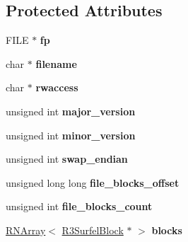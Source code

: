\subsection*{Protected Attributes}
\begin{DoxyCompactItemize}
\item 
F\+I\+LE $\ast$ {\bfseries fp}\hypertarget{class_r3_surfel_database_a3989dcfef3c4b81f7cb51388e44b7cf7}{}\label{class_r3_surfel_database_a3989dcfef3c4b81f7cb51388e44b7cf7}

\item 
char $\ast$ {\bfseries filename}\hypertarget{class_r3_surfel_database_adcab62eb583e8b42d8712c679f6bd3b0}{}\label{class_r3_surfel_database_adcab62eb583e8b42d8712c679f6bd3b0}

\item 
char $\ast$ {\bfseries rwaccess}\hypertarget{class_r3_surfel_database_a75c7d17ac62b8f7352e34e7138676f85}{}\label{class_r3_surfel_database_a75c7d17ac62b8f7352e34e7138676f85}

\item 
unsigned int {\bfseries major\+\_\+version}\hypertarget{class_r3_surfel_database_a66dd461499c48f418768e4017a2b25aa}{}\label{class_r3_surfel_database_a66dd461499c48f418768e4017a2b25aa}

\item 
unsigned int {\bfseries minor\+\_\+version}\hypertarget{class_r3_surfel_database_ac60a4adf7e59272520fd77da27ab2ac4}{}\label{class_r3_surfel_database_ac60a4adf7e59272520fd77da27ab2ac4}

\item 
unsigned int {\bfseries swap\+\_\+endian}\hypertarget{class_r3_surfel_database_afa765040d282c03f801c180928fa9410}{}\label{class_r3_surfel_database_afa765040d282c03f801c180928fa9410}

\item 
unsigned long long {\bfseries file\+\_\+blocks\+\_\+offset}\hypertarget{class_r3_surfel_database_a3d6ff43118f72e1db3df15a4d7518470}{}\label{class_r3_surfel_database_a3d6ff43118f72e1db3df15a4d7518470}

\item 
unsigned int {\bfseries file\+\_\+blocks\+\_\+count}\hypertarget{class_r3_surfel_database_af5351798bb27bc53418118b7db78158b}{}\label{class_r3_surfel_database_af5351798bb27bc53418118b7db78158b}

\item 
\hyperlink{class_r_n_array}{R\+N\+Array}$<$ \hyperlink{class_r3_surfel_block}{R3\+Surfel\+Block} $\ast$ $>$ {\bfseries blocks}\hypertarget{class_r3_surfel_database_a1e5843a85559f72ce02385cb179faefc}{}\label{class_r3_surfel_database_a1e5843a85559f72ce02385cb179faefc}


\end{DoxyCompactItemize}
